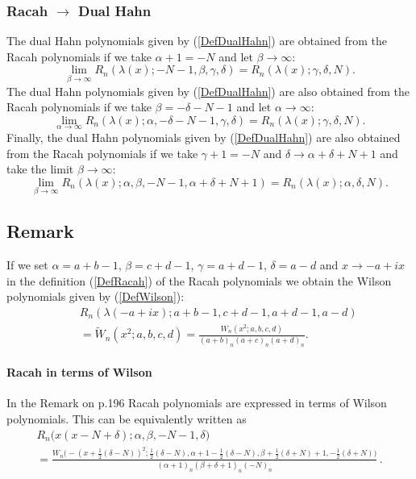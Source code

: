\documentclass[envcountchap,graybox]{svmono}
\newcounter{rom}
\newcommand\al\alpha
\newcommand\be\beta
\newcommand\de\delta
\newcommand\half{\frac12}
\newcommand\thalf{\tfrac12}
\begin{document}
\subsubsection*{Racah $\rightarrow$ Dual Hahn}
The dual Hahn polynomials given by (\ref{DefDualHahn}) are obtained from the Racah polynomials
if we take $\alpha+1=-N$ and let $\beta\rightarrow\infty$:
\begin{equation}
\lim_{\beta\rightarrow\infty}
R_n(\lambda(x);-N-1,\beta,\gamma,\delta)=R_n(\lambda(x);\gamma,\delta,N).
\end{equation}
The dual Hahn polynomials given by (\ref{DefDualHahn}) are also obtained from the Racah polynomials
if we take $\beta=-\delta-N-1$ and let $\alpha\rightarrow\infty$:
\begin{equation}
\lim_{\alpha\rightarrow\infty}
R_n(\lambda(x);\alpha,-\delta-N-1,\gamma,\delta)=R_n(\lambda(x);\gamma,\delta,N).
\end{equation}
Finally, the dual Hahn polynomials given by (\ref{DefDualHahn}) are also obtained from the Racah polynomials
if we take $\gamma+1=-N$ and $\delta\rightarrow\alpha+\delta+N+1$ and take the limit $\beta\rightarrow\infty$:
\begin{equation}
\lim_{\beta\rightarrow\infty}
R_n(\lambda(x);\alpha,\beta,-N-1,\alpha+\delta+N+1)=R_n(\lambda(x);\alpha,\delta,N).
\end{equation}

\newpage

\subsection*{Remark}
If we set $\alpha=a+b-1$, $\beta=c+d-1$, $\gamma=a+d-1$, $\delta=a-d$ and $x\rightarrow
-a+ix$ in the definition (\ref{DefRacah}) of the Racah polynomials we obtain
the Wilson polynomials given by (\ref{DefWilson}):
\begin{eqnarray*}
& &R_n(\lambda(-a+ix);a+b-1,c+d-1,a+d-1,a-d)\\
& &{}=\tilde{W}_n(x^2;a,b,c,d)=\frac{W_n(x^2;a,b,c,d)}{(a+b)_n(a+c)_n(a+d)_n}.
\end{eqnarray*}
\label{sec9.2}
\paragraph{Racah in terms of Wilson}
In the Remark on p.196 Racah polynomials are expressed in terms of
Wilson polynomials. This can be equivalently written as
\begin{multline}
R_n\big(x(x-N+\de);\al,\be,-N-1,\de\big)\\
=\frac{W_n\big(-(x+\thalf(\de-N))^2;\thalf(\de-N),\al+1-\thalf(\de-N),
\be+\thalf(\de+N)+1,-\half(\de+N)\big)}
{(\al+1)_n (\be+\de+1)_n (-N)_n}\,.
\label{146}
\end{multline}
%
\end{document}
